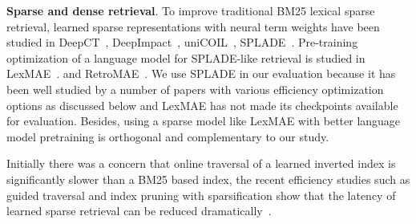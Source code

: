 
{\bf Sparse and dense retrieval}. 
To improve traditional BM25 lexical sparse retrieval, 
learned sparse representations with neural term weights have been studied in 
DeepCT~\cite{Dai2020deepct},
DeepImpact~\cite{Mallia2021deepimpact}, uniCOIL~\cite{Lin2021unicoil,2021NAACL-Gao-COIL},
SPLADE~\cite{Formal2021SPLADE, Formal2021SPLADEV2}. 
Pre-training optimization of a language model for SPLADE-like retrieval 
is studied in LexMAE~\cite{shen2023lexmae}. 
and RetroMAE~\cite{Liu2022RetroMAE}.
We use SPLADE in our evaluation because it has been well studied by  
a number of papers  with various efficiency optimization options as discussed below
and LexMAE has not made its checkpoints available for evaluation. 
Besides, using a sparse model like LexMAE with better language model pretraining is orthogonal and complementary to our study.

Initially there was a concern
that online traversal  of  a learned  inverted index is significantly slower than a BM25 based index,
the recent efficiency studies such as guided traversal and index pruning with sparsification 
show that the  latency of learned sparse retrieval  can be 
reduced dramatically~\cite{Lassance2022SPLADE-efficient,mallia2022faster,qiao2023optimizing,2023SIGIR-SPLADE-pruning}.

